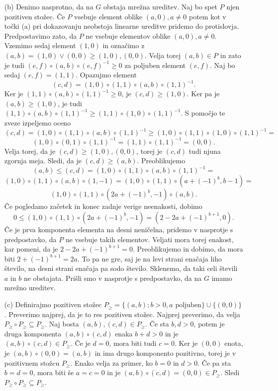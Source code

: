 \documentclass[a4paper, 12pt]{article}
\begin{document}
\begin{enumerate}
\item[(b)] Denimo nasprotno, da na $G$ obstaja mrežna ureditev. Naj bo spet $P$ njen pozitiven stožec. Če $P$ vsebuje element oblike $(a,0), a\neq 0$ potem kot v točki (a) pri dokazovanju neobstoja linearne ureditve pridemo do protislovja. Predpostavimo zato, da $P$ ne vsebuje elementov oblike $(a,0), a\neq 0$. Vzemimo sedaj element $(1,0)$ in označimo z $(a,b) = (1,0) \lor (0,0) \ge (1,0), (0,0)$. Velja torej $(a,b)\in P$ in zato je tudi $(e,f)\circ (a,b)\circ(e,f)^{-1} \ge 0$ za poljuben element $(e,f)$. Naj bo sedaj $(e,f) = (1,1)$. Opazujmo element
$$
(c,d) = (1,0)\circ (1,1)\circ (a,b) \circ (1,1)^{-1}.
$$
Ker je $(1,1)\circ (a,b) \circ (1,1)^{-1} \ge 0$, je $(c,d) \ge (1,0)$. Ker pa je $(a,b) \ge (1,0)$, je tudi $(1,1)\circ(a,b)\circ(1,1)^{-1} \ge (1,1)\circ (1,0) \circ (1,1)^{-1}$. S pomočjo te zveze izpeljemo oceno
$$
(c,d) = (1,0) \circ(1,1) \circ(a,b) \circ(1,1)^{-1} \ge (1,0) \circ (1,1) \circ(1,0) \circ(1,1)^{-1} =
$$
$$
(1,0) \circ (0,1) \circ(1,1)^{-1} = (1,1) \circ (1,1)^{-1} = (0,0).
$$
Velja torej, da je $(c,d) \ge (1,0), (0,0)$, torej je $(c,d)$ tudi njuna zgornja meja. Sledi, da je $(c,d) \ge (a,b)$. Preoblikujemo
$$
(a,b) \le (c,d)  =(1,0) \circ(1,1) \circ (a,b) \circ(1,1)^{-1} = 
$$
$$
(1,0) \circ (1,1) \circ (a,b) \circ (1,-1) = (1,0) \circ (1,1) \circ( a+(-1)^b,b-1) = 
$$
$$
(1,0) \circ (1,1) \circ(2a + (-1)^b, -1) \circ (a,b).
$$
Če pogledamo začetek in konec zadnje verige neenakosti, dobimo
$$
0 \le (1,0) \circ (1,1) \circ(2a + (-1)^b, -1) = (2-2a +(-1)^{b+1},0).
$$
Če je prva komponenta elementa na desni neničelna, pridemo v nasprotje s predpostavko, da $P$ ne vsebuje takih elementov. Veljati mora torej enakost, kar pomeni, da je $2-2a + (-1)^{b+1} = 0$. Preoblikujemo in dobimo, da mora biti $2+(-1)^{b+1} = 2a$. To pa ne gre, saj je na levi strani enačaja liho število, na desni strani enačaja pa sodo število. Sklenemo, da taki celi števili $a$ in $b$ ne obstajata. Prišli smo v nasprotje  s predpostavko, da na $G$ imamo mrežno ureditev.

\item[(c)] Definirajmo pozitiven stožec $P_{\ge} = \{(a,b); b > 0, a \text{ poljuben}\} \cup \{(0,0)\}$. Preverimo najprej, da je to res pozitiven stožec. Najprej preverimo, da velja $P_{\ge} \circ P_{\ge} \subseteq P_{ \ge}$. Naj bosta $(a,b), (c,d) \in P_{\ge}$. Če sta $b,d > 0$, potem je druga komponenta $(a,b)\circ (c,d)$ enaka $b+d > 0$ in je $(a,b)\circ (c,d) \in P_{\ge}$. Če je $d=0$, mora biti tudi $c=0$. Ker je $(0,0)$ enota, je $(a,b)\circ (0,0) = (a,b)$ in ima drugo komponento pozitivno, torej je v pozitivnem stožcu $P_{\ge}$. Enako velja za primer, ko $b=0$ in $d>0$. Če pa sta $b=d=0$, mora biti še $a=c=0$ in je $(a,b)\circ(c,d) = (0,0) \in P_{\ge}$. Sledi $P_{\ge} \circ P_{\ge} \subseteq P_{\ge}$.


\end{enumerate}
\end{document}
